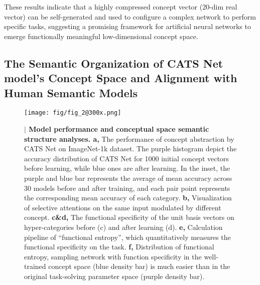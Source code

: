 \documentclass[pdflatex,sn-mathphys-num,lineno]{sn-jnl}%
\begin{document}
\begin{CJK}{UTF8}{gbsn}
These results indicate that a highly compressed concept vector (20-dim real vector) can be self-generated and used to configure a complex network to perform specific tasks, suggesting a promising framework for artificial neural networks to emerge functionally meaningful low-dimensional concept space. 

\subsection{The Semantic Organization of CATS Net model’s Concept Space and Alignment with Human Semantic Models}\label{subsec_space_prop} 

\begin{figure}[htbp]
\centering
\texttt{[image: fig/fig\_2@300x.png]}
\caption{\textbf{$\vert$ Model performance and conceptual space semantic structure analyses. a,} The performance of concept abstraction by CATS Net on ImageNet-1k dataset. The purple histogram depict the accuracy distribution of CATS Net for 1000 initial concept vectors before learning, while blue ones are after learning.  In the inset,  the purple and blue bar represents the average of mean accuracy across 30 models before and after training, and each pair point represents the corresponding mean accuracy of each category. \textbf{b,} Visualization of selective attentions on the same input modulated by different concept. \textbf{c\&d,} The functional specificity of the unit basis vectors on hyper-categories before (c) and after learning (d). \textbf{e,} Calculation pipeline of “functional entropy”, which quantitatively measures the functional specificity on the task. \textbf{f,} Distribution of functional entropy, sampling network with function specificity in the well-trained concept space (blue density bar) is much easier than in the original task-solving parameter space (purple density bar).}
\label{fig2}
\end{figure}


\end{CJK}
\end{document}
